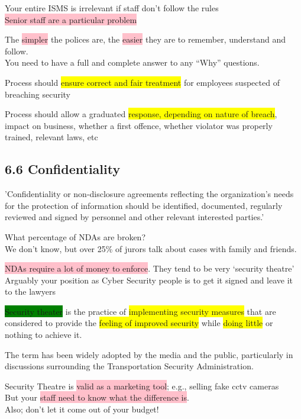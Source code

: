 \documentclass[tikz,border=10pt]{project_plan}
\begin{document}
Your entire ISMS is irrelevant if staff don’t follow the rules\\
\colorbox{pink}{Senior staff are a particular problem}

The \colorbox{pink}{simpler} the polices are, the \colorbox{pink}{easier} they are to remember, understand and follow. \\
You need to have a full and complete answer to any “Why” questions.

Process should \colorbox{yellow}{ensure correct and fair treatment} for employees suspected of breaching security

Process should allow a graduated \colorbox{yellow}{response, depending on nature of breach},
impact on business, whether a first offence, whether violator was
properly trained, relevant laws, etc

\subsection{6.6 Confidentiality}

'Confidentiality or non-disclosure agreements reflecting the organization's
needs for the protection of information should be identified, documented,
regularly reviewed and signed by personnel and other relevant interested parties.'

What percentage of NDAs are broken? \\
We don’t know, but over 25\% of jurors talk about cases with family and friends.

\colorbox{pink}{NDAs require a lot of money to enforce}. They tend to be very ‘security theatre’\\
Arguably your position as Cyber Security people is to get it signed and
leave it to the lawyers

\colorbox{green}{Security theater} is the practice of \colorbox{yellow}{implementing security measures} that are
considered to provide the \colorbox{yellow}{feeling of improved security} while \colorbox{yellow}{doing little} or
nothing to achieve it.

The term has been  widely adopted by the media and the public, particularly in
discussions surrounding the Transportation Security Administration.

Security Theatre is \colorbox{pink}{valid as a marketing tool}; e.g., selling fake cctv cameras\\
But your \colorbox{pink}{staff need to know what the difference is}. \\
Also; don’t let it come out of your budget!
\end{document}
